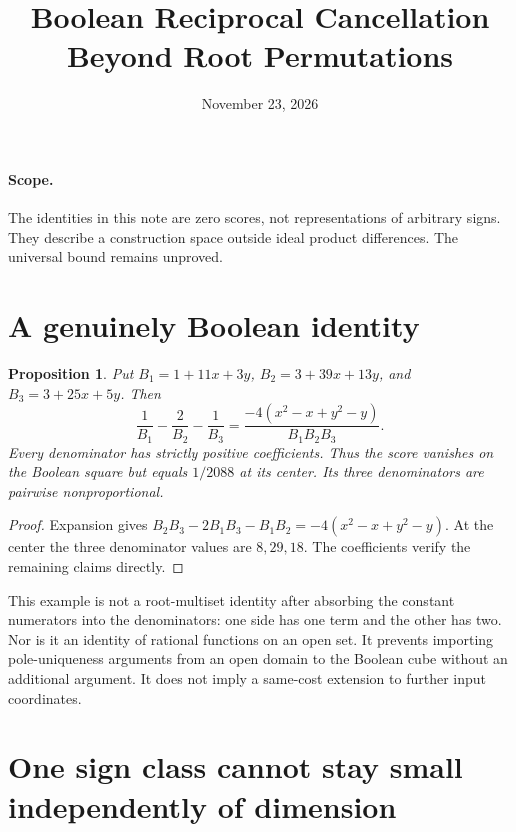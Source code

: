 \documentclass[11pt]{article}
\title{Boolean Reciprocal Cancellation Beyond Root Permutations}
\author{}
\date{November 23, 2026}
\newtheorem{proposition}[theorem]{Proposition}
\begin{document}
\maketitle

\paragraph{Scope.}
The identities in this note are zero scores, not representations of
arbitrary signs. They describe a construction space outside ideal
product differences. The universal bound remains unproved.

\section{A genuinely Boolean identity}

\begin{proposition}
Put $B_1=1+11x+3y$, $B_2=3+39x+13y$, and
$B_3=3+25x+5y$. Then
\[
 \frac1{B_1}-\frac2{B_2}-\frac1{B_3}
 =\frac{-4(x^2-x+y^2-y)}{B_1B_2B_3}.
 \tag{1}
\]
Every denominator has strictly positive coefficients. Thus the score
vanishes on the Boolean square but equals $1/2088$ at its center.
Its three denominators are pairwise nonproportional.
\end{proposition}
\begin{proof}
Expansion gives $B_2B_3-2B_1B_3-B_1B_2=-4(x^2-x+y^2-y)$.
At the center the three denominator values are $8,29,18$.
The coefficients verify the remaining claims directly.
\end{proof}

This example is not a root-multiset identity after absorbing the
constant numerators into the denominators: one side has one term and
the other has two. Nor is it an identity of rational functions on an
open set. It prevents importing pole-uniqueness arguments from an
open domain to the Boolean cube without an additional argument.
It does not imply a same-cost extension to further input coordinates.

\section{One sign class cannot stay small independently of dimension}
\end{document}
